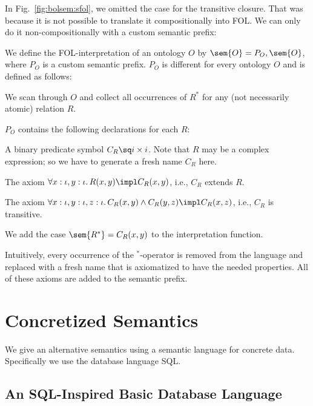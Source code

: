 \begin{example}\label{ex:noncompositional}
In Fig.~\ref{fig:bolsem:sfol}, we omitted the case for the transitive closure.
That was because it is not possible to translate it compositionally into FOL.
We can only do it non-compositionally with a custom semantic prefix:

We define the FOL-interpretation of an ontology $O$ by $\sem{O}=P_O,\sem{O}$, where $P_O$ is a custom semantic prefix.
$P_O$ is different for every ontology $O$ and is defined as follows:

\begin{compactenum}
 \item We scan through $O$ and collect all occurrences of $R^*$ for any (not necessarily atomic) relation $R$.
 \item $P_O$ contains the following declarations for each $R$:
  \begin{compactitem}
  \item A binary predicate symbol $C_R\sq i\times i$. Note that $R$ may be a complex expression; so we have to generate a fresh name $C_R$ here.
  \item The axiom $\forall x:\iota,y:\iota.\,R(x,y)\impl C_R(x,y)$, i.e., $C_R$ extends $R$.
  \item The axiom $\forall x:\iota,y:\iota,z:\iota.\,C_R(x,y)\wedge C_R(y,z)\impl C_R(x,z)$, i.e., $C_R$ is transitive.
  \end{compactitem}
 \item We add the case $\sem{R^*}=C_R(x,y)$ to the interpretation function.
\end{compactenum}

Intuitively, every occurrence of the $^*$-operator is removed from the language and replaced with a fresh name that is axiomatized to have the needed properties.
All of these axioms are added to the semantic prefix.
\end{example}

\section{Concretized Semantics}\label{sec:bolsem:conc}

We give an alternative semantics using a semantic language for concrete data.
Specifically we use the database language SQL.

\subsection{An SQL-Inspired Basic Database Language}\label{sec:wuv:bdl}
  

